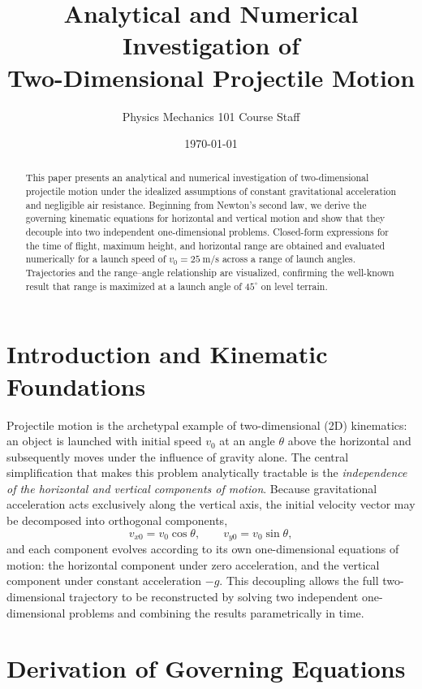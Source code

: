 \documentclass[11pt]{article}
\title{\textbf{Analytical and Numerical Investigation of \\ Two-Dimensional Projectile Motion}}
\author{Physics Mechanics 101 Course Staff}
\date{\today}
\begin{document}
\maketitle

\begin{abstract}
\noindent
This paper presents an analytical and numerical investigation of two-dimensional projectile motion under
the idealized assumptions of constant gravitational acceleration and negligible air resistance. Beginning
from Newton's second law, we derive the governing kinematic equations for horizontal and vertical motion
and show that they decouple into two independent one-dimensional problems. Closed-form expressions for the
time of flight, maximum height, and horizontal range are obtained and evaluated numerically for a launch
speed of $v_0 = 25~\mathrm{m/s}$ across a range of launch angles. Trajectories and the range--angle
relationship are visualized, confirming the well-known result that range is maximized at a launch angle of
$45^\circ$ on level terrain.
\end{abstract}

\section{Introduction and Kinematic Foundations}
\label{sec:intro}

Projectile motion is the archetypal example of two-dimensional (2D) kinematics: an object is launched with
initial speed $v_0$ at an angle $\theta$ above the horizontal and subsequently moves under the influence of
gravity alone. The central simplification that makes this problem analytically tractable is the
\emph{independence of the horizontal and vertical components of motion}. Because gravitational acceleration
acts exclusively along the vertical axis, the initial velocity vector may be decomposed into orthogonal
components,
\[
v_{x0} = v_0 \cos\theta, \qquad v_{y0} = v_0 \sin\theta,
\]
and each component evolves according to its own one-dimensional equations of motion: the horizontal
component under zero acceleration, and the vertical component under constant acceleration $-g$. This
decoupling allows the full two-dimensional trajectory to be reconstructed by solving two independent
one-dimensional problems and combining the results parametrically in time.

\section{Derivation of Governing Equations}
\label{sec:derivation}
\end{document}
